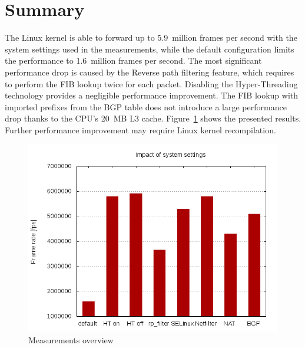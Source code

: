 \section{Summary}
The Linux kernel is able to forward up to 5.9~million frames per second
with the system settings used in the measurements,
while the default configuration limits the performance to 1.6~million frames per second.
The most significant performance drop is caused by the Reverse path filtering feature,
which requires to perform the FIB lookup twice for each packet.
Disabling the Hyper-Threading technology provides a negligible performance improvement.
The FIB lookup with imported prefixes from the BGP table does not introduce a large performance drop
thanks to the CPU's 20~MB L3 cache.
Figure~\ref{fig:measurements-overview} shows the presented results.
Further performance improvement may require Linux kernel recompilation.
	\begin{figure}[H]
		\centering
		\includegraphics[width=11.25cm,keepaspectratio]{fig/settings.png}
		\caption{Measurements overview}
		\label{fig:measurements-overview}
	\end{figure}

